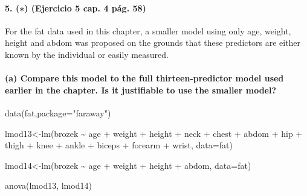\documentclass[
]{article}
\newenvironment{Shaded}{\begin{snugshade}}{\end{snugshade}}
\newcommand{\AttributeTok}[1]{\textcolor[rgb]{0.77,0.63,0.00}{#1}}
\newcommand{\FunctionTok}[1]{\textcolor[rgb]{0.00,0.00,0.00}{#1}}
\newcommand{\NormalTok}[1]{#1}
\newcommand{\OtherTok}[1]{\textcolor[rgb]{0.56,0.35,0.01}{#1}}
\newcommand{\SpecialCharTok}[1]{\textcolor[rgb]{0.00,0.00,0.00}{#1}}
\newcommand{\StringTok}[1]{\textcolor[rgb]{0.31,0.60,0.02}{#1}}
\begin{document}
\hypertarget{ejercicio-5-cap.-4-puxe1g.-58}{%
\paragraph{5. (∗) (Ejercicio 5 cap. 4 pág.
58)}\label{ejercicio-5-cap.-4-puxe1g.-58}}

For the fat data used in this chapter, a smaller model using only age,
weight, height and abdom was proposed on the grounds that these
predictors are either known by the individual or easily measured.

\hypertarget{a-compare-this-model-to-the-full-thirteen-predictor-model-used-earlier-in-the-chapter.-is-it-justifiable-to-use-the-smaller-model}{%
\paragraph{(a) Compare this model to the full thirteen-predictor model
used earlier in the chapter. Is it justifiable to use the smaller
model?}\label{a-compare-this-model-to-the-full-thirteen-predictor-model-used-earlier-in-the-chapter.-is-it-justifiable-to-use-the-smaller-model}}

\begin{Shaded}
\begin{Highlighting}[]
\FunctionTok{data}\NormalTok{(fat,}\AttributeTok{package=}\StringTok{"faraway"}\NormalTok{)}

\NormalTok{lmod13}\OtherTok{\textless{}{-}}\FunctionTok{lm}\NormalTok{(brozek }\SpecialCharTok{\textasciitilde{}}\NormalTok{ age }\SpecialCharTok{+}\NormalTok{ weight }\SpecialCharTok{+}\NormalTok{ height }\SpecialCharTok{+}\NormalTok{ neck }\SpecialCharTok{+}\NormalTok{ chest }\SpecialCharTok{+}\NormalTok{ abdom }\SpecialCharTok{+}
\NormalTok{               hip }\SpecialCharTok{+}\NormalTok{ thigh }\SpecialCharTok{+}\NormalTok{ knee }\SpecialCharTok{+}\NormalTok{ ankle }\SpecialCharTok{+}\NormalTok{ biceps }\SpecialCharTok{+}\NormalTok{ forearm }\SpecialCharTok{+}\NormalTok{ wrist, }\AttributeTok{data=}\NormalTok{fat)}

\NormalTok{lmod14}\OtherTok{\textless{}{-}}\FunctionTok{lm}\NormalTok{(brozek }\SpecialCharTok{\textasciitilde{}}\NormalTok{ age }\SpecialCharTok{+}\NormalTok{  weight }\SpecialCharTok{+}\NormalTok{  height }\SpecialCharTok{+}\NormalTok{ abdom, }\AttributeTok{data=}\NormalTok{fat)}

\FunctionTok{anova}\NormalTok{(lmod13, lmod14)}
\end{Highlighting}
\end{Shaded}
\end{document}

